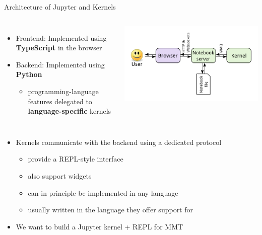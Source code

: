 \documentclass{beamer}
\begin{document}
    \begin{frame}{Architecture of Jupyter and Kernels}
        \begin{columns}
            \begin{itemize}
                \item Frontend: Implemented using \textbf{TypeScript} in the browser
                \item Backend: Implemented using \textbf{Python}
                \begin{itemize}
                    \item programming-language features delegated to \textbf{language-specific} kernels
                \end{itemize}
            \end{itemize}
            \centering
            \includegraphics[scale=0.25]{images/jupyterarch}
        \end{columns}
        \begin{itemize}
            \item Kernels communicate with the backend using a dedicated protocol
            \begin{itemize}
                \item provide a REPL-style interface
                \item also support widgets
                \item can in principle be implemented in any language
                \item usually written in the language they offer support for
            \end{itemize}
            \item We want to build a Jupyter kernel + REPL for MMT
        \end{itemize}
        
    \end{frame}
\end{document}
